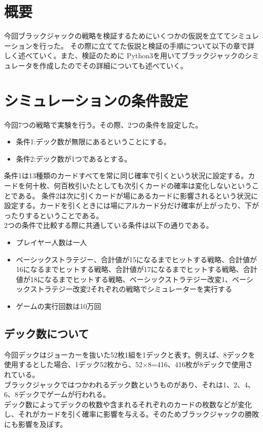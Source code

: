 \section{概要}
今回ブラックジャックの戦略を検証するためにいくつかの仮説を立ててシミュレーションを行った。
その際に立ててた仮説と検証の手順について以下の章で詳しく述べていく。また、検証のために
Python3を用いてブラックジャックのシミュレータを作成したのでその詳細についても述べていく。


\section{シミュレーションの条件設定}
今回7つの戦略で実験を行う。その際、2つの条件を設定した。
\begin{itemize}
\item 条件1:デック数が無限にあるということにする。
\item 条件2:デック数が1つであるとする。
\end{itemize}
条件1は13種類のカードすべてを常に同じ確率で引くという状況に設定する。カードを何十枚、何百枚引いたとしても次引くカードの確率は変化しないということである。
条件2は次に引くカードが場にあるカードに影響されるという状況に設定する。カードを引くときには場にアルカード分だけ確率が上がったり、下がったりするということである。\\
2つの条件で比較する際に共通している条件は以下の通りである。
\begin{itemize}
\item プレイヤー人数は一人
\item ベーシックストラテジー、合計値が15になるまでヒットする戦略、合計値が16になるまでヒットする戦略、合計値が17になるまでヒットする戦略、合計値が18になるまでヒットする戦略、ベーシックストラテジー改変1、ベーシックストラテジー改変2それぞれの戦略でシミュレーターを実行する
\item ゲームの実行回数は10万回
\end{itemize}

\subsection{デック数について}
今回デックはジョーカーを抜いた52枚1組を1デックと表す。例えば、8デックを使用するとした場合、1デック52枚から、52×8=416、416枚が8デックで使用されている。\\
ブラックジャックではつかわれるデック数というものがあり、それは1、2、4、6、8デックでゲームが行われる。\\
デック数によってデックの枚数や含まれるそれぞれのカードの枚数などが変化し、それがカードを引く確率に影響を与える。そのためブラックジャックの勝敗にも影響を及ぼす。

